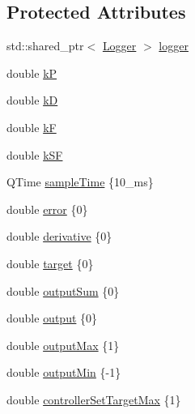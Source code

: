 \subsection*{Protected Attributes}
\begin{DoxyCompactItemize}
\item 
std\+::shared\+\_\+ptr$<$ \mbox{\hyperlink{classokapi_1_1Logger}{Logger}} $>$ \mbox{\hyperlink{classokapi_1_1IterativeVelPIDController_a463b84f9fa62ac28ea37ba30106add0d}{logger}}
\item 
double \mbox{\hyperlink{classokapi_1_1IterativeVelPIDController_a39e27eefd9472119889c38144c0594dd}{kP}}
\item 
double \mbox{\hyperlink{classokapi_1_1IterativeVelPIDController_a52cebe581d6ce98fd8cb904303b05a5c}{kD}}
\item 
double \mbox{\hyperlink{classokapi_1_1IterativeVelPIDController_a8cc93f84dd1726ecfd8c73a266370f16}{kF}}
\item 
double \mbox{\hyperlink{classokapi_1_1IterativeVelPIDController_a3b95c5e55360fff952840bf7961026c9}{k\+SF}}
\item 
Q\+Time \mbox{\hyperlink{classokapi_1_1IterativeVelPIDController_a2026bfca681440317f7438015cd5e8b6}{sample\+Time}} \{10\+\_\+ms\}
\item 
double \mbox{\hyperlink{classokapi_1_1IterativeVelPIDController_aab9a4c3a210222d4cbf657275ecfe0c2}{error}} \{0\}
\item 
double \mbox{\hyperlink{classokapi_1_1IterativeVelPIDController_a3e99093a42c63df3a0fd226e109f9e2f}{derivative}} \{0\}
\item 
double \mbox{\hyperlink{classokapi_1_1IterativeVelPIDController_aa4c6743b6c5fcfe58ea89c726dd26b7c}{target}} \{0\}
\item 
double \mbox{\hyperlink{classokapi_1_1IterativeVelPIDController_a5bb1e61b7ff4f5059bf8478a23c00e67}{output\+Sum}} \{0\}
\item 
double \mbox{\hyperlink{classokapi_1_1IterativeVelPIDController_aafae6f8e5a24247978322b3d0b5913d4}{output}} \{0\}
\item 
double \mbox{\hyperlink{classokapi_1_1IterativeVelPIDController_ad73d0f93c88697ddeb3c8c72cc006d22}{output\+Max}} \{1\}
\item 
double \mbox{\hyperlink{classokapi_1_1IterativeVelPIDController_adfe740241f314d7965491c04dce6a5da}{output\+Min}} \{-\/1\}
\item 
double \mbox{\hyperlink{classokapi_1_1IterativeVelPIDController_ad1ebdfe3c8f2190688b06356735b429f}{controller\+Set\+Target\+Max}} \{1\}

\end{DoxyCompactItemize}
